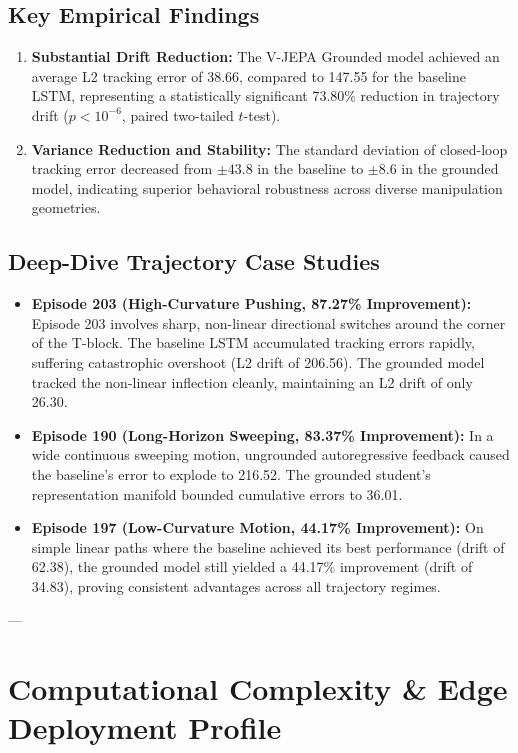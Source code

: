 \documentclass[11pt,a4paper]{article}
\begin{document}
\subsection{Key Empirical Findings}
\begin{enumerate}
    \item \textbf{Substantial Drift Reduction:} The V-JEPA Grounded model achieved an average L2 tracking error of 38.66, compared to 147.55 for the baseline LSTM, representing a statistically significant 73.80\% reduction in trajectory drift ($p < 10^{-6}$, paired two-tailed $t$-test).
    \item \textbf{Variance Reduction and Stability:} The standard deviation of closed-loop tracking error decreased from $\pm 43.8$ in the baseline to $\pm 8.6$ in the grounded model, indicating superior behavioral robustness across diverse manipulation geometries.
\end{enumerate}

\subsection{Deep-Dive Trajectory Case Studies}
\begin{itemize}
    \item \textbf{Episode 203 (High-Curvature Pushing, 87.27\% Improvement):} Episode 203 involves sharp, non-linear directional switches around the corner of the T-block. The baseline LSTM accumulated tracking errors rapidly, suffering catastrophic overshoot (L2 drift of 206.56). The grounded model tracked the non-linear inflection cleanly, maintaining an L2 drift of only 26.30.
    \item \textbf{Episode 190 (Long-Horizon Sweeping, 83.37\% Improvement):} In a wide continuous sweeping motion, ungrounded autoregressive feedback caused the baseline's error to explode to 216.52. The grounded student's representation manifold bounded cumulative errors to 36.01.
    \item \textbf{Episode 197 (Low-Curvature Motion, 44.17\% Improvement):} On simple linear paths where the baseline achieved its best performance (drift of 62.38), the grounded model still yielded a 44.17\% improvement (drift of 34.83), proving consistent advantages across all trajectory regimes.
\end{itemize}

---

\section{Computational Complexity \& Edge Deployment Profile}
\label{sec:complexity}
\end{document}
